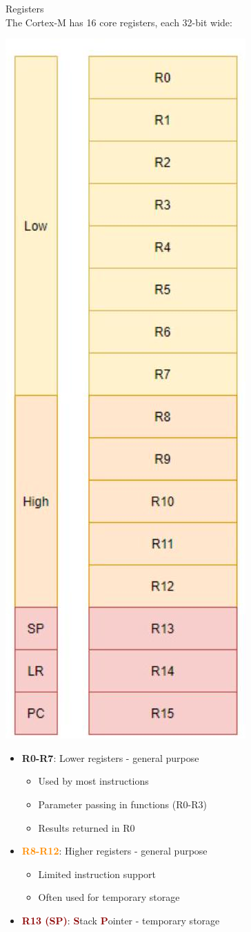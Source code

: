 \begin{definition}{Registers}\\
The Cortex-M has 16 core registers, each 32-bit wide:

\includegraphics[width=0.35\linewidth, angle=90]{images/2024_12_29_79e6b22f503fb7b4f718g-02}
\begin{itemize}
  \item \textcolor{darkcorn}{\textbf{R0-R7}}: Lower registers - general purpose
    \begin{itemize}
      \item Used by most instructions
      \item Parameter passing in functions (R0-R3)
      \item Results returned in R0
    \end{itemize}
  \item \textcolor{darkorange}{\textbf{R8-R12}}: Higher registers - general purpose
    \begin{itemize}
      \item Limited instruction support
      \item Often used for temporary storage
    \end{itemize}
  \item \textcolor{darkred}{\textbf{R13 (SP)}}: \textcolor{darkred}{\textbf{S}}tack \textcolor{darkred}{\textbf{P}}ointer - temporary storage

\end{itemize}
\end{definition}
